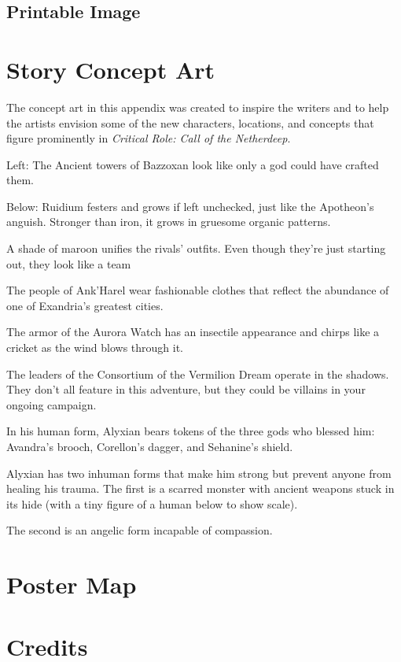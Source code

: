 \documentclass[10pt,a4paper,twoside,bg=print,twocolumn,openany,nodeprecatedcode]{dndbook}
\begin{document}
\section{Printable Image}
\chapter{Story Concept Art}
The concept art in this appendix was created to inspire the writers and to help the artists envision some of the new characters, locations, and concepts that figure prominently in \textit{Critical Role: Call of the Netherdeep}.

Left: The Ancient towers of Bazzoxan look like only a god could have crafted them.

Below: Ruidium festers and grows if left unchecked, just like the Apotheon's anguish. Stronger than iron, it grows in gruesome organic patterns.

A shade of maroon unifies the rivals' outfits. Even though they're just starting out, they look like a team

The people of Ank'Harel wear fashionable clothes that reflect the abundance of one of Exandria's greatest cities.

The armor of the Aurora Watch has an insectile appearance and chirps like a cricket as the wind blows through it.

The leaders of the Consortium of the Vermilion Dream operate in the shadows. They don't all feature in this adventure, but they could be villains in your ongoing campaign.

In his human form, Alyxian bears tokens of the three gods who blessed him: Avandra's brooch, Corellon's dagger, and Sehanine's shield.

Alyxian has two inhuman forms that make him strong but prevent anyone from healing his trauma. The first is a scarred monster with ancient weapons stuck in its hide (with a tiny figure of a human below to show scale).

The second is an angelic form incapable of compassion.

\chapter{Poster Map}
\chapter{Credits}
\end{document}
